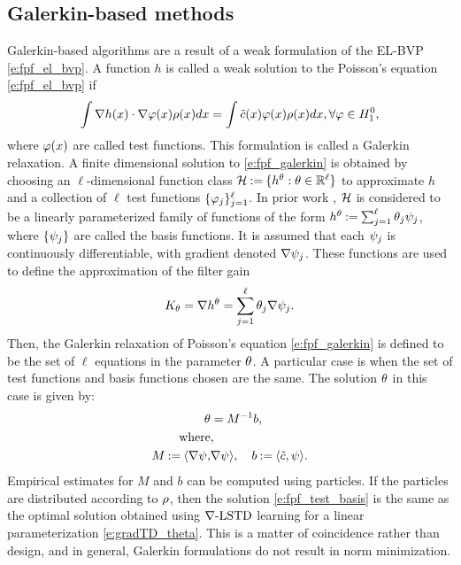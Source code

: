 \subsection{Galerkin-based methods}
\label{s:galerkin}
Galerkin-based algorithms are a result of a weak formulation of the EL-BVP \eqref{e:fpf_el_bvp}. A function $h$ is called a weak solution to the Poisson's equation \eqref{e:fpf_el_bvp} if
\begin{equation}
\int \nabla h (x) \cdot \nabla \test(x)  \pr(x) dx = \int \tilc(x) \test(x) \pr(x) dx, \forall \test \in H^0_1,
\label{e:fpf_galerkin}
\end{equation}
where $\varphi(x)$ are called test functions. This formulation is called a Galerkin relaxation. 
A finite dimensional solution to \eqref{e:fpf_galerkin} is obtained by choosing an $\ell$-dimensional  function class
${\cal H}  \mathbin{:=} \{h^\theta : \theta \in \mathbb{R}^\ell\}$ to approximate $h$ and a collection of $\ell$ test functions $\{\varphi_j\}_{j=1}^{\ell}$. In prior work \cite{yanmehmey13,yanlaumehmey16}, ${\cal H}$ is considered to be a linearly parameterized family of functions of the form $h^\theta \mathbin{:=} \sum_{j=1}^{\ell}\theta_{j}\psi_{j} $, where $\{\psi_j\}$ are called the basis functions.  It is assumed that each $\psi_j$ is continuously differentiable,  with gradient denoted   $\nabla \psi_{j} $.
 These   functions are used to define the approximation of the filter gain
\begin{equation}
K_\param = \nabla h^\param= \sum_{j=1}^{\ell}\param_{j}\gradbasis_{j}.
\label{e:fpf_basis_galerkin}
\end{equation}
Then, the Galerkin relaxation of Poisson's equation \eqref{e:fpf_galerkin} is defined to be the set of $\ell$ equations in the parameter $\theta$. A particular case is when the set of test functions and basis functions chosen are the same. The solution $\theta$ in this case is given by:
\begin{equation}
\begin{aligned}
\param & = M^{-1} b, \\
\text{where}&,\\ 
M \eqdef \langle \gradbasis, &\gradbasis \rangle, \quad b \eqdef \langle \tilc, \basis \rangle.
\label{e:fpf_test_basis}
\end{aligned}
\end{equation}
Empirical estimates for $M$ and $b$ can be computed using particles. If the particles are distributed according to $\rho$, then the solution \eqref{e:fpf_test_basis} is the same as the optimal solution obtained using $\nabla\text{-LSTD}$ learning for a linear parameterization \eqref{e:gradTD_theta}. This is a matter of coincidence rather than design, and in general, Galerkin formulations do not result in norm minimization. 

